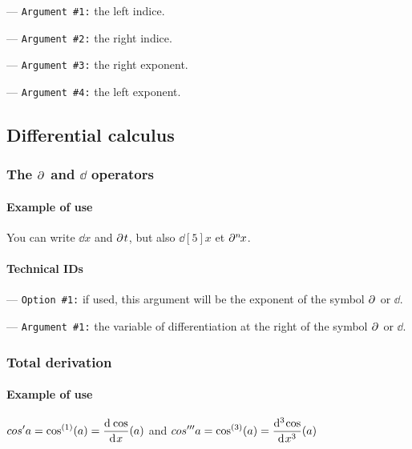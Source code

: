\documentclass[12pt,a4paper]{article}
\makeatletter
\newcommand\IDmacro{\@ifstar{\@IDmacroStar}{\@IDmacroNoStar}}
\newcommand\@IDmacroNoStar[3]{%
        \texttt{%
        	\textbackslash#1%
        	\IfStrEq{#2}{0}{}{%
        		\,\,[#2 Option%
				\IfStrEq{#2}{1}{}{s}]%
			}%
    	    \,\,(#3 Argument%
				\IfStrEq{#3}{1}{}{s})%
	   	}
        \immediate\write\tempfile{macro@#1@#2@#3}%
    }
\newcommand\@IDmacroStar[2]{%
        \@IDmacroNoStar{#1}{0}{#2}%
    }
\newcommand\@IDoptarg[2]{%
    	\vspace{0.5em}
		--- \texttt{#1 \##2:}%
	}
\newcommand\IDoption[1]{%
    	\@IDoptarg{Option}{#1}%
	}
\newcommand\IDarg[1]{%
    	\@IDoptarg{Argument}{#1}%
	}
\makeatother
\begin{document}
\IDarg{1} the left indice.

\IDarg{2} the right indice.

\IDarg{3} the right exponent.

\IDarg{4} the left exponent.




\subsection{Differential calculus}

    \subsubsection{\texorpdfstring{The $\pp{}$ and $\dd{}$ operators}%
                               {The "rounded d" and "straight d" operators}}

        \paragraph{Example of use}

\begin{tcblisting}{}
You can write $\dd{x}$ and $\pp{t}$, but also $ \dd[5]{x}$ et $\pp[n]{x}$.
\end{tcblisting}


        \paragraph{Technical IDs}

\IDmacro{dd}{1}{1}

\IDmacro{pp}{1}{1}

\IDoption{1} if used, this argument will be the exponent of the symbol $\pp{}$ or $\dd{}$.

\IDarg{1} the variable of differentiation at the right of the symbol $\pp{}$ or $\dd{}$.



    \subsubsection{Total derivation}

        \paragraph{Example of use}

\begin{tcblisting}{}
$\displaystyle cos' a = \derpow{\cos} (a) = \derfrac{\cos}{x} (a)$
and
$\displaystyle cos''' a = \derpow[3]{\cos} (a) = \derfrac[3]{\cos}{x} (a)$
\end{tcblisting}
\end{document}

